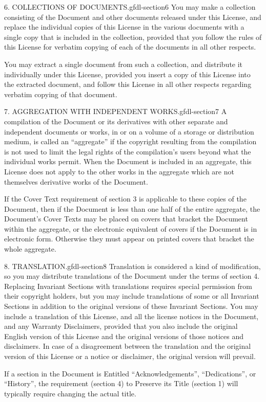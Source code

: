 \documentclass[10pt,]{book}
\numberwithin{equation}{section}
\begin{document}
\begin{paragraphs}{6. COLLECTIONS OF DOCUMENTS.}{gfdl-section6}%
\hypertarget{p-1569}{}%
You may make a collection consisting of the Document and other documents released under this License, and replace the individual copies of this License in the various documents with a single copy that is included in the collection, provided that you follow the rules of this License for verbatim copying of each of the documents in all other respects.%
\par
\hypertarget{p-1570}{}%
You may extract a single document from such a collection, and distribute it individually under this License, provided you insert a copy of this License into the extracted document, and follow this License in all other respects regarding verbatim copying of that document.%
\end{paragraphs}%
\begin{paragraphs}{7. AGGREGATION WITH INDEPENDENT WORKS.}{gfdl-section7}%
\hypertarget{p-1571}{}%
A compilation of the Document or its derivatives with other separate and independent documents or works, in or on a volume of a storage or distribution medium, is called an ``aggregate'' if the copyright resulting from the compilation is not used to limit the legal rights of the compilation's users beyond what the individual works permit. When the Document is included in an aggregate, this License does not apply to the other works in the aggregate which are not themselves derivative works of the Document.%
\par
\hypertarget{p-1572}{}%
If the Cover Text requirement of section 3 is applicable to these copies of the Document, then if the Document is less than one half of the entire aggregate, the Document's Cover Texts may be placed on covers that bracket the Document within the aggregate, or the electronic equivalent of covers if the Document is in electronic form. Otherwise they must appear on printed covers that bracket the whole aggregate.%
\end{paragraphs}%
\begin{paragraphs}{8. TRANSLATION.}{gfdl-section8}%
\hypertarget{p-1573}{}%
Translation is considered a kind of modification, so you may distribute translations of the Document under the terms of section 4. Replacing Invariant Sections with translations requires special permission from their copyright holders, but you may include translations of some or all Invariant Sections in addition to the original versions of these Invariant Sections. You may include a translation of this License, and all the license notices in the Document, and any Warranty Disclaimers, provided that you also include the original English version of this License and the original versions of those notices and disclaimers. In case of a disagreement between the translation and the original version of this License or a notice or disclaimer, the original version will prevail.%
\par
\hypertarget{p-1574}{}%
If a section in the Document is Entitled ``Acknowledgements'', ``Dedications'', or ``History'', the requirement (section 4) to Preserve its Title (section 1) will typically require changing the actual title.%
\end{paragraphs}%
\end{document}
